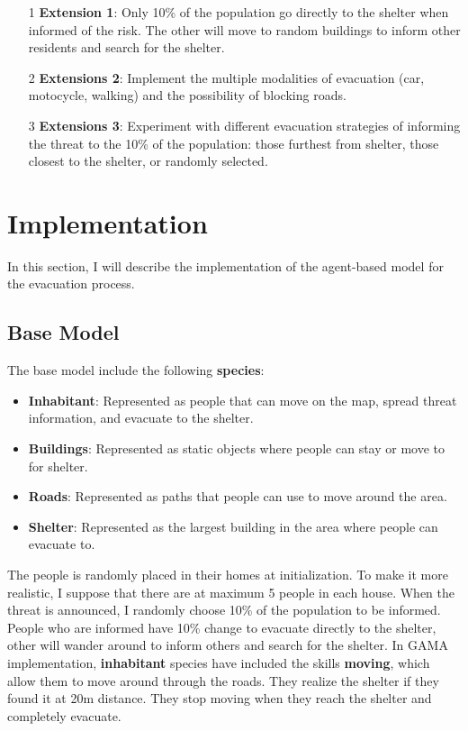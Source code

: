 \documentclass[12pt]{article}
\begin{document}
\begin{itemize}
\item[1] \textbf{Extension 1}: Only 10\% of the population go directly to the shelter when informed of the risk. The other will move to random buildings to inform other residents and search for the shelter.
\item[2] \textbf{Extensions 2}: Implement the multiple modalities of evacuation (car, motocycle, walking) and the possibility of blocking roads.
\item[3] \textbf{Extensions 3}: Experiment with different evacuation strategies of informing the threat to the 10\% of the population: those furthest from shelter, those closest to the shelter, or randomly selected.
\end{itemize}




\section{Implementation}
In this section, I will describe the implementation of the agent-based model for the evacuation process. 

\subsection{Base Model}
The base model include the following \textbf{species}:
\begin{itemize}
    \item \textbf{Inhabitant}: Represented as people that can move on the map, spread threat information, and evacuate to the shelter.
    \item \textbf{Buildings}: Represented as static objects where people can stay or move to for shelter.
    \item \textbf{Roads}: Represented as paths that people can use to move around the area.
    \item \textbf{Shelter}: Represented as the largest building in the area where people can evacuate to.
\end{itemize}

The people is randomly placed in their homes at initialization. To make it more realistic, I suppose that there are at maximum 5 people in each house. When the threat is announced, I randomly choose 10\% of the population to be informed. People who are informed have 10\% change to evacuate directly to the shelter, other will wander around to inform others and search for the shelter. In GAMA implementation, \textbf{inhabitant} species have included the skills \textbf{moving}, which allow them to move around through the roads. They realize the shelter if they found it at 20m distance. They stop moving when they reach the shelter and completely evacuate. \\
\end{document}
